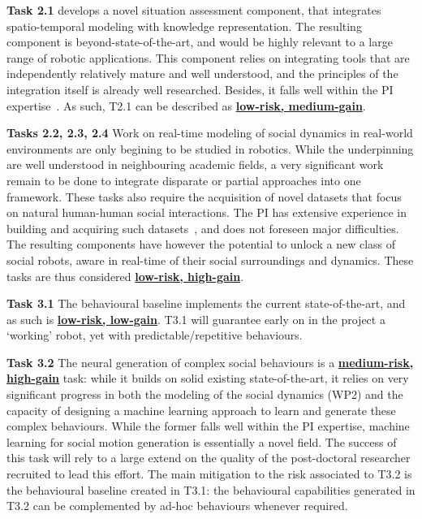 \vspace{1em}

\textbf{Task 2.1} develops a novel situation assessment component, that
integrates spatio-temporal modeling with knowledge representation. The resulting
component is beyond-state-of-the-art, and would be highly relevant to a large range
of robotic applications. This component relies on integrating tools that are
independently relatively mature and well understood, and the principles of the
integration itself is already well researched. Besides, it falls well within the
PI
expertise~.
As such, T2.1 can be described as \ul{\bf low-risk, medium-gain}.

\textbf{Tasks 2.2, 2.3, 2.4} Work on real-time modeling of social dynamics in
real-world environments are only begining to be studied in robotics. While the
underpinning are well understood in neighbouring academic fields, a very
significant work remain to be done to integrate disparate or partial approaches
into one framework. These tasks also require the acquisition of novel datasets
that focus on natural human-human social interactions. The PI has extensive
experience in building and acquiring such
datasets~, and does not
foreseen major difficulties. The resulting components have however the potential
to unlock a new class of social robots, aware in real-time of their social
surroundings and dynamics.  These tasks are thus considered \ul{\bf low-risk,
high-gain}.

\vspace{1em}

\textbf{Task 3.1} The behavioural baseline implements the current state-of-the-art,
and as such is \ul{\bf low-risk, low-gain}. T3.1 will guarantee early on in the
project a `working' robot, yet with predictable/repetitive behaviours.

\textbf{Task 3.2} The neural generation of complex social behaviours is a
\ul{\bf medium-risk, high-gain} task: while it builds on solid existing
state-of-the-art, it relies on very significant progress in both the modeling of the
social dynamics (WP2) and the capacity of designing a machine learning approach
to learn and generate these complex behaviours. While the former falls well
within the PI expertise, machine learning for social motion generation is
essentially a novel field. The success of this task will rely to a large
extend on the quality of the post-doctoral researcher recruited to lead this
effort. The main mitigation to the risk associated to T3.2 is the behavioural
baseline created in T3.1: the behavioural capabilities generated in T3.2 can be
complemented by ad-hoc behaviours whenever required.


